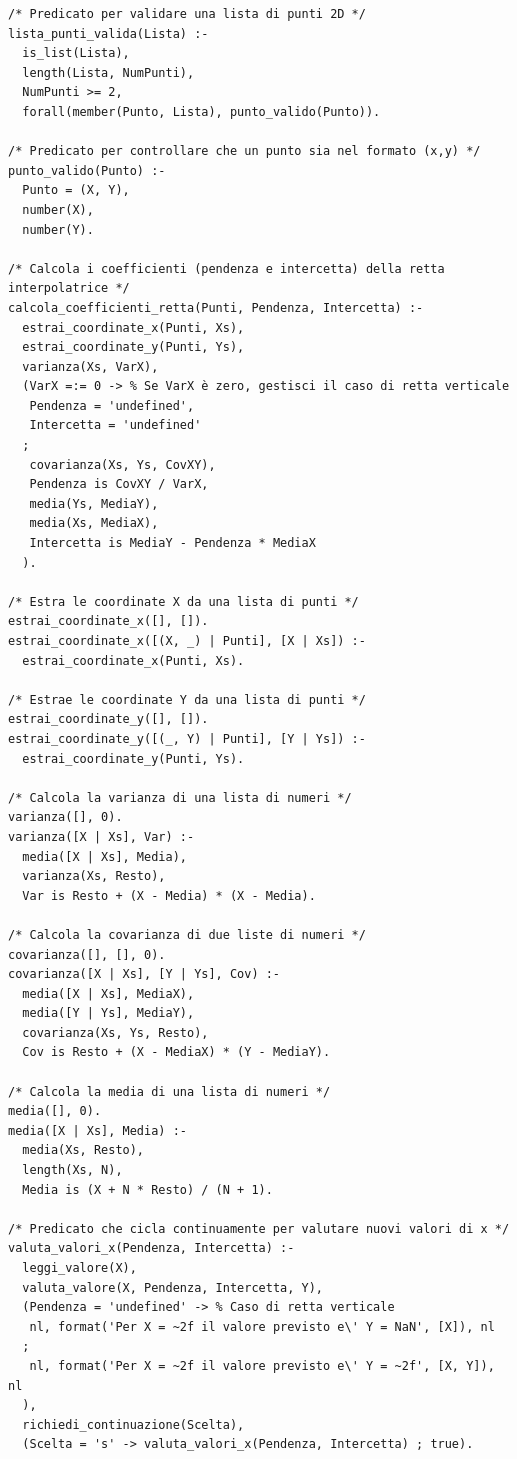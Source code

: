 \documentclass[11pt]{article}
\theoremstyle{definition}
\begin{document}
\begin{verbatim}
/* Predicato per validare una lista di punti 2D */
lista_punti_valida(Lista) :-
  is_list(Lista),
  length(Lista, NumPunti),
  NumPunti >= 2,
  forall(member(Punto, Lista), punto_valido(Punto)).
  
/* Predicato per controllare che un punto sia nel formato (x,y) */
punto_valido(Punto) :- 
  Punto = (X, Y),
  number(X),
  number(Y).

/* Calcola i coefficienti (pendenza e intercetta) della retta interpolatrice */
calcola_coefficienti_retta(Punti, Pendenza, Intercetta) :-
  estrai_coordinate_x(Punti, Xs),
  estrai_coordinate_y(Punti, Ys),
  varianza(Xs, VarX),
  (VarX =:= 0 -> % Se VarX è zero, gestisci il caso di retta verticale
   Pendenza = 'undefined',
   Intercetta = 'undefined'
  ; 
   covarianza(Xs, Ys, CovXY),
   Pendenza is CovXY / VarX,
   media(Ys, MediaY),
   media(Xs, MediaX),
   Intercetta is MediaY - Pendenza * MediaX
  ).
 
/* Estra le coordinate X da una lista di punti */
estrai_coordinate_x([], []).
estrai_coordinate_x([(X, _) | Punti], [X | Xs]) :-
  estrai_coordinate_x(Punti, Xs).
  
/* Estrae le coordinate Y da una lista di punti */
estrai_coordinate_y([], []).
estrai_coordinate_y([(_, Y) | Punti], [Y | Ys]) :-
  estrai_coordinate_y(Punti, Ys).

/* Calcola la varianza di una lista di numeri */  
varianza([], 0).
varianza([X | Xs], Var) :-
  media([X | Xs], Media),
  varianza(Xs, Resto),
  Var is Resto + (X - Media) * (X - Media).
	
/* Calcola la covarianza di due liste di numeri */
covarianza([], [], 0).
covarianza([X | Xs], [Y | Ys], Cov) :-
  media([X | Xs], MediaX),
  media([Y | Ys], MediaY),
  covarianza(Xs, Ys, Resto),
  Cov is Resto + (X - MediaX) * (Y - MediaY).

/* Calcola la media di una lista di numeri */
media([], 0).
media([X | Xs], Media) :-
  media(Xs, Resto),
  length(Xs, N),
  Media is (X + N * Resto) / (N + 1).

/* Predicato che cicla continuamente per valutare nuovi valori di x */
valuta_valori_x(Pendenza, Intercetta) :-
  leggi_valore(X),
  valuta_valore(X, Pendenza, Intercetta, Y),
  (Pendenza = 'undefined' -> % Caso di retta verticale
   nl, format('Per X = ~2f il valore previsto e\' Y = NaN', [X]), nl
  ;
   nl, format('Per X = ~2f il valore previsto e\' Y = ~2f', [X, Y]), nl
  ),
  richiedi_continuazione(Scelta),
  (Scelta = 's' -> valuta_valori_x(Pendenza, Intercetta) ; true).


\end{verbatim}
\end{document}
